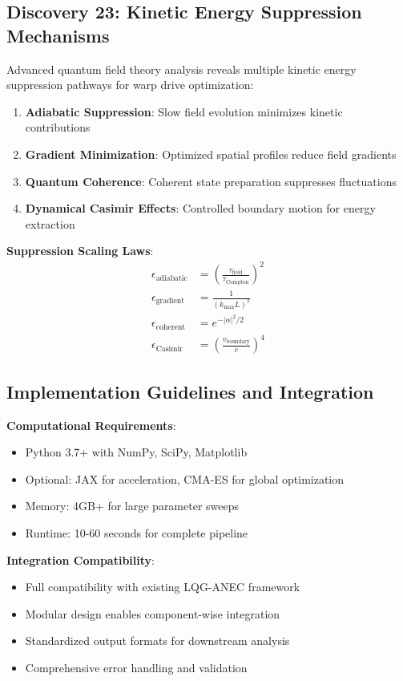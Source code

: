 \documentclass[11pt,a4paper]{article}
\begin{document}
\begin{table}[h]
\begin{table}[h]
\begin{table}[h]
\subsection{Discovery 23: Kinetic Energy Suppression Mechanisms}

Advanced quantum field theory analysis reveals multiple kinetic energy suppression pathways for warp drive optimization:

\begin{enumerate}
\item \textbf{Adiabatic Suppression}: Slow field evolution minimizes kinetic contributions
\item \textbf{Gradient Minimization}: Optimized spatial profiles reduce field gradients  
\item \textbf{Quantum Coherence}: Coherent state preparation suppresses fluctuations
\item \textbf{Dynamical Casimir Effects}: Controlled boundary motion for energy extraction
\end{enumerate}

\textbf{Suppression Scaling Laws}:
\begin{align}
\epsilon_{\text{adiabatic}} &= \left(\frac{\tau_{\text{field}}}{\tau_{\text{Compton}}}\right)^2 \\
\epsilon_{\text{gradient}} &= \frac{1}{(k_{\text{max}} L)^2} \\
\epsilon_{\text{coherent}} &= e^{-|\alpha|^2/2} \\
\epsilon_{\text{Casimir}} &= \left(\frac{v_{\text{boundary}}}{c}\right)^4
\end{align}

\subsection{Implementation Guidelines and Integration}

\textbf{Computational Requirements}:
\begin{itemize}
\item Python 3.7+ with NumPy, SciPy, Matplotlib
\item Optional: JAX for acceleration, CMA-ES for global optimization
\item Memory: 4GB+ for large parameter sweeps
\item Runtime: 10-60 seconds for complete pipeline
\end{itemize}

\textbf{Integration Compatibility}:
\begin{itemize}
\item Full compatibility with existing LQG-ANEC framework
\item Modular design enables component-wise integration
\item Standardized output formats for downstream analysis
\item Comprehensive error handling and validation
\end{itemize}


\end{table}
\end{table}
\end{table}
\end{document}
